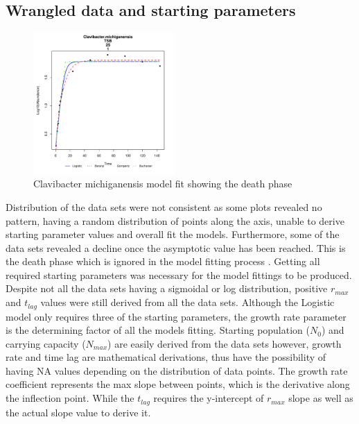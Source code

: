 \documentclass[11pt]{article}
\begin{document}
\subsection{Wrangled data and starting parameters}
\begin{figure}
    \begin{center}
        \includegraphics[width=0.48\textwidth]{../Results/Cmichiganensis25_fit.pdf}
    \end{center}
    \caption{Clavibacter michiganensis model fit showing the death phase}
    \label{fig:Clavibacter michiganensis}
\end{figure}

Distribution of the data sets were not consistent as some plots revealed no pattern, having a random distribution of points along the axis, unable to derive starting parameter values and overall fit the models. Furthermore, some of the data sets revealed a decline once the asymptotic value has been reached. This is the death phase which is ignored in the model fitting process \cite{zwietering1990modeling}. Getting all required starting parameters was necessary for the model fittings to be produced. Despite not all the data sets having a sigmoidal or log distribution, positive $r_{max}$ and  $t_{lag}$ values were still derived from all the data sets. Although the Logistic model only requires three of the starting parameters, the growth rate parameter is the determining factor of all the models fitting. Starting population ($N_0$) and carrying capacity ($N_{max}$) are easily derived from the data sets however, growth rate and time lag are mathematical derivations, thus have the possibility of having NA values depending on the distribution of data points. The growth rate coefficient represents the max slope between points, which is the derivative along the inflection point. While the $t_{lag}$ requires the y-intercept of $r_{max}$ slope as well as the actual slope value to derive it.
\end{document}
